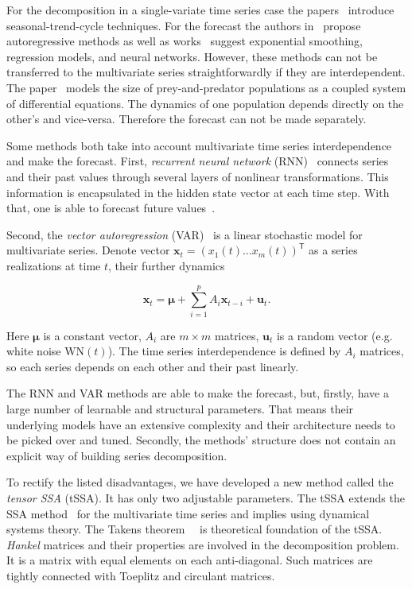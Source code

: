 \documentclass[referee, pdflatex, sn-mathphys-num]{sn-jnl}
\theoremstyle{definition}
\theoremstyle{plain}
\begin{document}
	For the decomposition in a single-variate time series case the papers~\cite{enders2010applied, x11, cleveland90} introduce seasonal-trend-cycle techniques. For the forecast the authors in~\cite{Box_Jenkins_methodology} propose autoregressive methods as well as works~\cite{3b1355aedd1041f1853e609a410576f3, enders2010applied} suggest exponential smoothing, regression models, and neural networks. However, these methods can not be transferred to the multivariate series straightforwardly if they are interdependent. The paper~\cite{Volterra:1928} models the size of prey-and-predator populations as a coupled system of differential equations. The dynamics of one population depends directly on the other's and vice-versa. Therefore the forecast can not be made separately. 
	
	Some methods both take into account multivariate time series interdependence and make the forecast. First, \emph{recurrent neural network} (RNN)~\cite{neco} connects series and their past values through several layers of nonlinear transformations. This information is encapsulated in the hidden state vector at each time step. With that, one is able to forecast future values~\cite{TEALAB2018334}.
	
	Second, the	\emph{vector autoregression} (VAR)~\cite{VAR_model1, doi:10.1080/01621459.1962.10480664} is a linear stochastic model for multivariate series. Denote vector $ \mathbf{x}_t = (x_1(t) \ldots x_m(t))^{\mathsf{T}} $ as a series realizations at time $ t $, their further dynamics
	
	\begin{equation*}
		\mathbf{x}_t = \boldsymbol{\mu} + \sum\limits_{i = 1}^p A_i \mathbf{x}_{t - i} + \mathbf{u}_t.
	\end{equation*}
	
	Here  $ \boldsymbol{\mu} $ is a constant vector, $ A_i $ are $ m \times m $ matrices, $ \mathbf{u}_t $ is a random vector (e.g. white noise $ \text{WN}(t) $). The time series interdependence is defined by $ A_i $ matrices, so each series depends on each other and their past linearly.
	
	The RNN and VAR methods are able to make the forecast, but, firstly, have a large number of learnable and structural parameters. That means their underlying models have an extensive complexity and their architecture needs to be picked over and tuned. Secondly, the methods' structure does not contain an explicit way of building series decomposition.
	
	To rectify the listed disadvantages, we have developed a new method called the \emph{tensor SSA} (tSSA). It has only two adjustable parameters. The tSSA extends the SSA method~\cite{ecfb9dc578be43ae9ee8fc88b8ff9151} for the multivariate time series and implies using dynamical systems theory. The Takens theorem~~\cite{citeulike:2735031} is theoretical foundation of the tSSA. \emph{Hankel} matrices and their properties are involved in the decomposition problem. It is a matrix with equal elements on each anti-diagonal. Such matrices are tightly connected with Toeplitz and circulant matrices.
	
\end{document}

